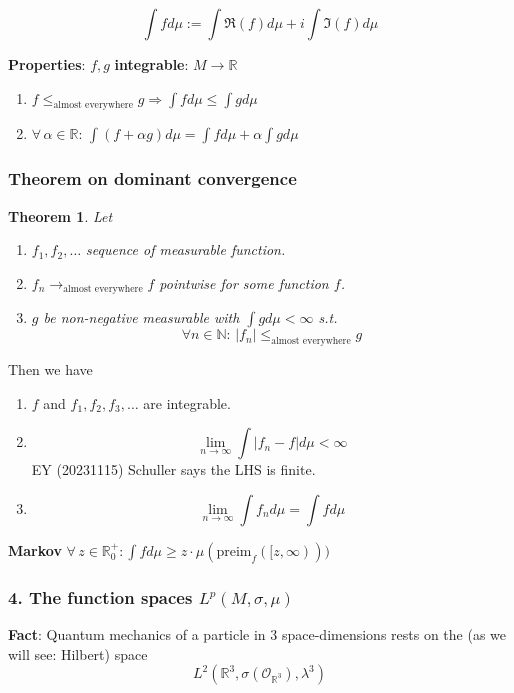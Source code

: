 \documentclass[10pt]{amsart}
\newtheorem{theorem}{Theorem}
\begin{document}
\begin{multicols*}{2}
\[
\int f d\mu := \int \Re{(f)} d\mu + i \int \Im{(f)} d\mu
\]

\textbf{Properties}: $f,g$ \textbf{integrable}: $M \to \mathbb{R}$
\begin{enumerate}
	\item[(i)] $f \leq_{\text{almost everywhere}} g \Longrightarrow \int f d\mu \leq \int g d\mu$
	\item[(ii)] $\forall \, \alpha \in \mathbb{R}$: $\int (f+\alpha g) d\mu = \int f d\mu + \alpha \int g d\mu$
\end{enumerate}

\subsubsection*{Theorem on dominant convergence}

\begin{theorem}
	Let \begin{enumerate}
		\item[(a)] $f_1, f_2, \dots$ sequence of measurable function. 
		\item[(b)] $f_n \to_{\text{almost everywhere}} f$ pointwise for some function $f$. 
		\item[(c)] $g$ be non-negative measurable with $\int g d\mu < \infty$ s.t.
		\[
		\forall n \in \mathbb{N} : \, |f_n| \leq_{\text{almost everywhere}} g
		\]
	\end{enumerate}
\end{theorem}

Then we have
\begin{enumerate}
	\item[(i)] $f$ and $f_1, f_2, f_3, \dots$ are integrable.
	\item[(ii)] \[
	\lim_{n\to \infty} \int |f_n - f| d\mu < \infty
	\] EY (20231115) Schuller says the LHS is finite.
	\item[(iii)] 
	\[
	\lim_{n\to \infty} \int f_n d\mu = \int f d\mu
	\]
\end{enumerate}

\textbf{Markov} $\forall \, z \in \mathbb{R}_0^+ : \int f d\mu \geq z \cdot \mu(\text{preim}_f([z, \infty) ))$

\subsubsection{4. The function spaces $L^p(M, \sigma, \mu)$}

\textbf{Fact}: Quantum mechanics of a particle in 3 space-dimensions rests on the (as we will see: Hilbert) space
\[
L^2(\mathbb{R}^3, \sigma(\mathcal{O}_{\mathbb{R}^3} ), \lambda^3)
\]


\end{multicols*}
\end{document}
